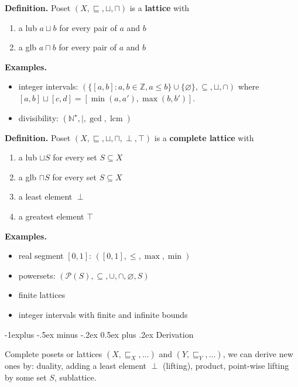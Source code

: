\documentclass[10pt,landscape]{article}
\makeatletter
\renewcommand{\subsection}{\@startsection{subsection}{2}{0mm}%
                                {-1explus -.5ex minus -.2ex}%
                                {0.5ex plus .2ex}%
                                {\normalfont\normalsize\bfseries}}
\makeatother
\begin{document}
\begin{multicols}{3}
\textbf{Definition.} Poset $(X, \sqsubseteq, \sqcup, \sqcap)$ is a \textbf{lattice} with
\begin{enumerate}\setlength{\itemsep}{-0.7mm}
\item a lub $a \sqcup b$ for every pair of $a$ and $b$
\item a glb $a \sqcap b$ for every pair of $a$ and $b$
\end{enumerate}

\textbf{Examples.}
\begin{itemize}\setlength{\itemsep}{-0.7mm}
\item integer intervals: $(\{ [a, b] : a, b \in \mathbb{Z}, a \leq b\} \cup \{ \varnothing \}, \subseteq, \sqcup, \cap)$ where $[a, b] \sqcup [c, d] = [\operatorname{min} (a, a'), \operatorname{max} (b, b')]$.
\item divisibility: $(\mathbb{N}^{\star}, |, \operatorname{gcd}, \operatorname{lcm})$
\end{itemize}

\textbf{Definition.} Poset $(X, \sqsubseteq, \sqcup, \sqcap, \perp, \top)$ is a \textbf{complete lattice} with
\begin{enumerate}\setlength{\itemsep}{-0.7mm}
\item a lub $\sqcup S$ for every set $S \subseteq X$
\item a glb $\sqcap S$ for every set $S \subseteq X$
\item a least element $\perp$
\item a greatest element $\top$
\end{enumerate}

\textbf{Examples.}
\begin{itemize}\setlength{\itemsep}{-0.7mm}
\item real segment $[0, 1]$: $([0, 1], \leq, \operatorname{max}, \operatorname{min})$
\item powersets: $(\mathcal{P}(S), \subseteq, \cup, \cap, \varnothing, S)$
\item finite lattices
\item integer intervals with finite and infinite bounds
\end{itemize}

\subsection{Derivation}

Complete posets or lattices $(X, \sqsubseteq_X, \dots)$ and $(Y, \sqsubseteq_Y, \dots)$, we can derive new ones by: duality, adding a least element $\perp$ (lifting), product, point-wise lifting by some set $S$, sublattice.


\end{multicols}
\end{document}
